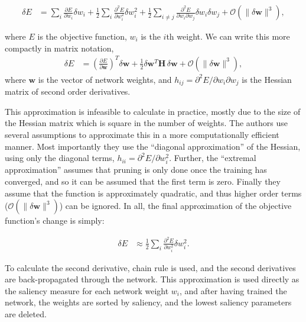 \documentclass[thesis]{subfiles}
\begin{document}

    \begin{align}
       \delta E &= \sum_i \frac{\partial E}{\partial w_i} \delta w_i + \frac{1}{2} \sum_i \frac{\partial^2 E}{\partial w_i^2} \delta w_i^2 + \frac{1}{2} \sum_{i\neq j} \frac{\partial^2 E}{\partial w_i \partial w_j} \delta w_i \delta w_j +\mathcal{O}(\|\delta \mathbf{w}\|^3),
    \end{align}

    where $E$ is the objective function, $w_i$ is the $i$th weight. We can write this more compactly in matrix notation,
    \begin{align}
       \delta E &= \left( \frac{\partial E}{\partial \mathbf{w}} \right)^T \delta \mathbf{w} +\frac{1}{2}\delta \mathbf{w}^T \mathbf{H}\, \delta \mathbf{w} +\mathcal{O}(\|\delta \mathbf{w}\|^3),
    \end{align}
    where $\mathbf{w}$ is the vector of network weights, and $h_{ij}=\partial^2 E / \partial w_i \partial w_j$ is the Hessian matrix of second order derivatives. 

    This approximation is infeasible to calculate in practice, mostly due to the size of the Hessian matrix which is square in the number of weights. The authors use several assumptions to approximate this in a more computationally efficient manner. Most importantly they use the ``diagonal approximation'' of the Hessian, using only the diagonal terms, $h_{ii}=\partial^2 E / \partial w_i^2$. Further, the ``extremal approximation'' assumes that pruning is only done once the training has converged, and so it can be assumed that the first term is zero. Finally they assume that the function is approximately quadratic, and thus higher order terms (\ie $\mathcal{O}(\|\delta \mathbf{w}\|^3)$) can be ignored. In all, the final approximation of the objective function's change is simply:

    \begin{align}
       \delta E &\approx \frac{1}{2} \sum_i \frac{\partial^2 E}{\partial w_i^2} \delta w_i^2.
    \end{align}

    To calculate the second derivative, chain rule is used, and the second derivatives are back-propagated through the network. This approximation is used directly as the saliency measure for each network weight $w_i$, and after having trained the network, the weights are sorted by saliency, and the lowest saliency parameters are deleted.
    
\end{document}
